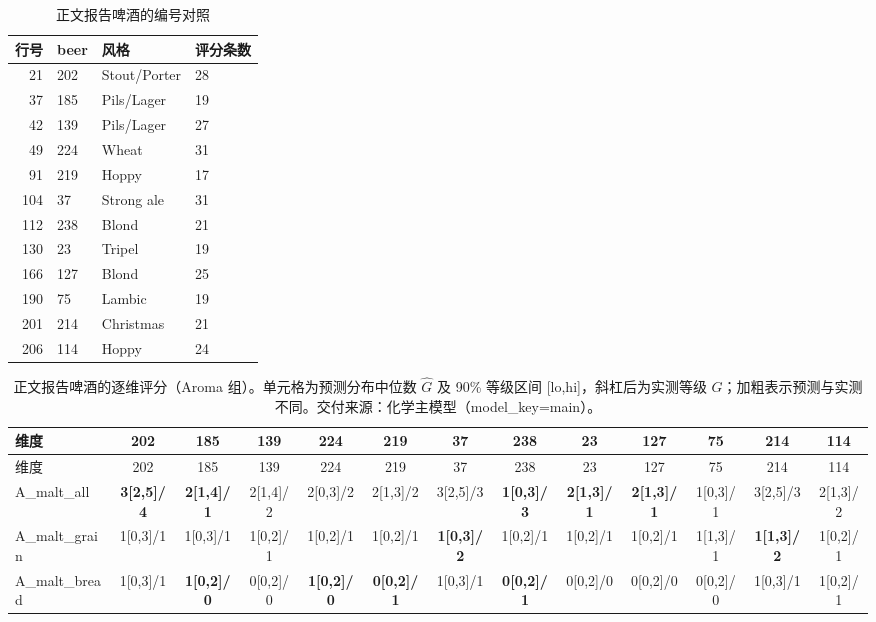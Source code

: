 \begin{landscape}
\scriptsize
\begin{table}[h]
\centering
\caption{正文报告啤酒的编号对照}\label{tab:q1_report_beers_map_aroma}
\begin{tabular}{rlll}
\toprule
行号 & beer & 风格 & 评分条数 \\
\midrule
21 & 202 & Stout/Porter & 28 \\
37 & 185 & Pils/Lager & 19 \\
42 & 139 & Pils/Lager & 27 \\
49 & 224 & Wheat & 31 \\
91 & 219 & Hoppy & 17 \\
104 & 37 & Strong ale & 31 \\
112 & 238 & Blond & 21 \\
130 & 23 & Tripel & 19 \\
166 & 127 & Blond & 25 \\
190 & 75 & Lambic & 19 \\
201 & 214 & Christmas & 21 \\
206 & 114 & Hoppy & 24 \\
\bottomrule
\end{tabular}
\end{table}
\begin{longtable}{lcccccccccccc}
\caption{正文报告啤酒的逐维评分（Aroma 组）。单元格为预测分布中位数 $\hat G$ 及 90\% 等级区间 [lo,hi]，斜杠后为实测等级 $G$；加粗表示预测与实测不同。交付来源：化学主模型（model\_key=main）。}\label{tab:q1_report_beers_aroma}\\
\toprule
维度 & 202 & 185 & 139 & 224 & 219 & 37 & 238 & 23 & 127 & 75 & 214 & 114 \\
\midrule
\endfirsthead
\toprule
维度 & 202 & 185 & 139 & 224 & 219 & 37 & 238 & 23 & 127 & 75 & 214 & 114 \\
\midrule
\endhead
\bottomrule
\endfoot
A\_malt\_all & \textbf{3[2,5]/4} & \textbf{2[1,4]/1} & 2[1,4]/2 & 2[0,3]/2 & 2[1,3]/2 & 3[2,5]/3 & \textbf{1[0,3]/3} & \textbf{2[1,3]/1} & \textbf{2[1,3]/1} & 1[0,3]/1 & 3[2,5]/3 & 2[1,3]/2 \\
A\_malt\_grain & 1[0,3]/1 & 1[0,3]/1 & 1[0,2]/1 & 1[0,2]/1 & 1[0,2]/1 & \textbf{1[0,3]/2} & 1[0,2]/1 & 1[0,2]/1 & 1[0,2]/1 & 1[1,3]/1 & \textbf{1[1,3]/2} & 1[0,2]/1 \\
A\_malt\_bread & 1[0,3]/1 & \textbf{1[0,2]/0} & 0[0,2]/0 & \textbf{1[0,2]/0} & \textbf{0[0,2]/1} & 1[0,3]/1 & \textbf{0[0,2]/1} & 0[0,2]/0 & 0[0,2]/0 & 0[0,2]/0 & 1[0,3]/1 & 1[0,2]/1 \\

\end{longtable}
\end{landscape}
